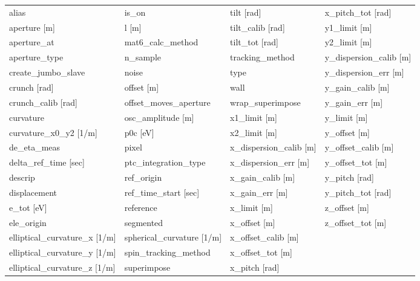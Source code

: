  \begin{tabular}{llll} \toprule
alias                            & is_on                            & tilt [rad]                       & x_pitch_tot [rad]                \\
aperture [m]                     & l [m]                            & tilt_calib [rad]                 & y1_limit [m]                     \\
aperture_at                      & mat6_calc_method                 & tilt_tot [rad]                   & y2_limit [m]                     \\
aperture_type                    & n_sample                         & tracking_method                  & y_dispersion_calib [m]           \\
create_jumbo_slave               & noise                            & type                             & y_dispersion_err [m]             \\
crunch [rad]                     & offset [m]                       & wall                             & y_gain_calib [m]                 \\
crunch_calib [rad]               & offset_moves_aperture            & wrap_superimpose                 & y_gain_err [m]                   \\
curvature                        & osc_amplitude [m]                & x1_limit [m]                     & y_limit [m]                      \\
curvature_x0_y2 [1/m]            & p0c [eV]                         & x2_limit [m]                     & y_offset [m]                     \\
de_eta_meas                      & pixel                            & x_dispersion_calib [m]           & y_offset_calib [m]               \\
delta_ref_time [sec]             & ptc_integration_type             & x_dispersion_err [m]             & y_offset_tot [m]                 \\
descrip                          & ref_origin                       & x_gain_calib [m]                 & y_pitch [rad]                    \\
displacement                     & ref_time_start [sec]             & x_gain_err [m]                   & y_pitch_tot [rad]                \\
e_tot [eV]                       & reference                        & x_limit [m]                      & z_offset [m]                     \\
ele_origin                       & segmented                        & x_offset [m]                     & z_offset_tot [m]                 \\
elliptical_curvature_x [1/m]     & spherical_curvature [1/m]        & x_offset_calib [m]               &                                  \\
elliptical_curvature_y [1/m]     & spin_tracking_method             & x_offset_tot [m]                 &                                  \\
elliptical_curvature_z [1/m]     & superimpose                      & x_pitch [rad]                    &                                  \\
 \bottomrule
 \end{tabular}
